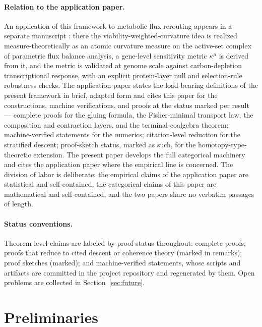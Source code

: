 \documentclass[11pt,a4paper]{article}
\theoremstyle{plain}
\theoremstyle{definition}
\theoremstyle{remark}
\begin{document}
\paragraph{Relation to the application paper.}
An application of this framework to metabolic flux rerouting appears
in a separate manuscript \citep{zai2026measure}: there the
viability-weighted-curvature idea is realized measure-theoretically
as an atomic curvature measure on the active-set complex of
parametric flux balance analysis, a gene-level sensitivity metric
$\kappa^{\mu}$ is derived from it, and the metric is validated at
genome scale against carbon-depletion transcriptional response,
with an explicit protein-layer null and selection-rule robustness
checks. The application paper states the load-bearing definitions
of the present framework in brief, adapted form and cites this
paper for the constructions, machine verifications, and proofs at
the status marked per result --- complete proofs for the gluing
formula, the Fisher-minimal transport law, the composition and
contraction layers, and the terminal-coalgebra theorem;
machine-verified statements for the numerics; citation-level
reduction for the stratified descent; proof-sketch status, marked
as such, for the homotopy-type-theoretic extension. The present
paper develops the full categorical machinery and cites the
application paper where the empirical line is concerned. The division of labor is
deliberate: the empirical claims of the application paper are
statistical and self-contained, the categorical claims of this
paper are mathematical and self-contained, and the two papers share
no verbatim passages of length.

\paragraph{Status conventions.}
Theorem-level claims are labeled by proof status throughout:
complete proofs; proofs that reduce to cited descent or coherence
theory (marked in remarks); proof sketches (marked); and
machine-verified statements, whose scripts and artifacts are
committed in the project repository and regenerated by them. Open
problems are collected in Section~\ref{sec:future}.

\section{Preliminaries}\label{sec:prelim}
\end{document}
